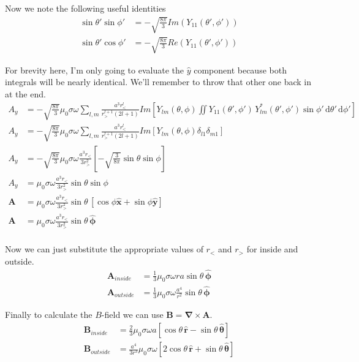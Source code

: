 \documentclass[10pt,a4paper]{article}
\begin{document}
Now we note the following useful identities
\begin{align}
\sin\theta'\sin\phi'&=-\sqrt{\frac{8\pi}{3}}Im(Y_{11}(\theta',\phi')) \\
\sin\theta'\cos\phi'&=-\sqrt{\frac{8\pi}{3}}Re(Y_{11}(\theta',\phi'))
\end{align}

For brevity here, I'm only going to evaluate the $\hat{y}$ component because both integrals will be nearly identical.  We'll remember to throw that other one back in at the end.
\begin{align}
A_y&=-\sqrt{\frac{8\pi}{3}}\mu_0\sigma\omega\sum_{l,m}\frac{a^3r_<^l}{r_>^{l+1}(2l+1)}Im\left[Y_{lm}(\theta ,\phi)\iint Y_{11}(\theta',\phi') \,Y^*_{lm}(\theta',\phi')\sin\phi'\,\mathrm{d}\theta'\,\mathrm{d}\phi'\right] \\
A_y&=-\sqrt{\frac{8\pi}{3}}\mu_0\sigma\omega\sum_{l,m}\frac{a^3r_<^l}{r_>^{l+1}(2l+1)}Im\left[Y_{lm}(\theta ,\phi)\delta_{l1}\delta_{m1}\right] \\
A_y&=-\sqrt{\frac{8\pi}{3}}\mu_0\sigma\omega\frac{a^3r_<}{3r_>^2}\left[-\sqrt{\frac{3}{8\pi}}\sin\theta\sin\phi\right] \\
A_y&=\mu_0\sigma\omega\frac{a^3r_<}{3r_>^2}\sin\theta\sin\phi \\
\mathbf{A}&=\mu_0\sigma\omega\frac{a^3r_<}{3r_>^2}\sin\theta\,[\cos\phi \mathbf{\hat{x}}+\sin\phi \mathbf{\hat{y}}]\\
\mathbf{A}&=\mu_0\sigma\omega\frac{a^3r_<}{3r_>^2}\sin\theta\,\mathbf{\hat{\phi}}\\
\end{align}

Now we can just substitute the appropriate values of $r_<$ and $r_>$ for inside and outside.
\begin{align}
\mathbf{A}_{inside}&=\frac{1}{3}\mu_0\sigma\omega ra\sin\theta\,\mathbf{\hat{\phi}} \\
\mathbf{A}_{outside}&=\frac{1}{3}\mu_0\sigma\omega \frac{a^4}{r^2}\sin\theta\,\mathbf{\hat{\phi}}
\end{align}

Finally to calculate the $B$-field we can use $\mathbf{B}=\mathbf{\nabla}\times\mathbf{A}$.
\begin{align}
\mathbf{B}_{inside}&=\frac{2}{3}\mu_0 \sigma \omega a [\cos\theta \,\mathbf{\hat{r}}-\sin\theta\,\mathbf{\hat{\theta}}]\\
\mathbf{B}_{outside}&=\frac{a^4}{3r^3}\mu_0\sigma\omega[2\cos\theta\,\mathbf{\hat{r}}+\sin\theta\,\mathbf{\hat{\theta}}]
\end{align}
\end{document}
